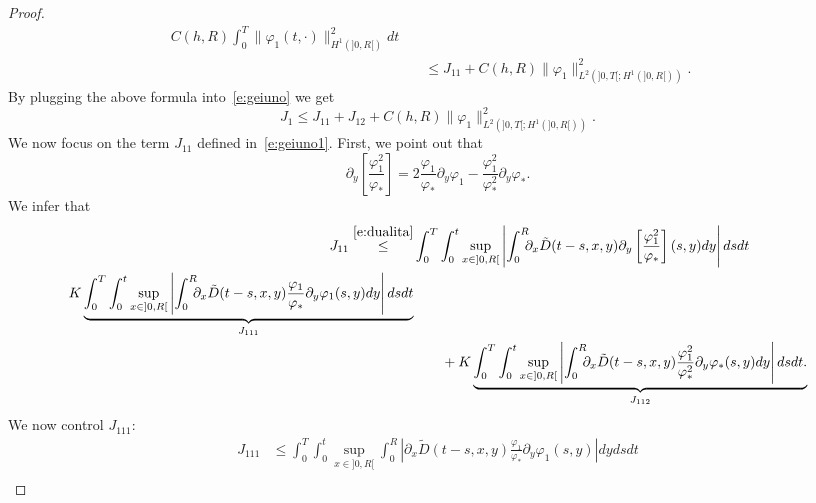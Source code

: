 \documentclass[11pt,leqno]{amsart}
\numberwithin{equation}{section}
\begin{document}
\begin{proof}
\begin{equation}
\begin{split}
   C(h, R) \int_0^T \| {\varphi}_1 (t, \cdot) \|^2_{H^1 (]0, R[)} dt
   \phantom{\int} \\
   & 
   \leq J_{11} + 
   C(h, R)  \| {\varphi}_1 \|^2_{L^2 (]0, T[ ; H^1 (]0, R[))}. 
    \phantom{\int} 
\end{split}
\end{equation}
By plugging the above formula into~\eqref{e:geiuno} we get 
\begin{equation}
\label{e:geiuno2}
  J_1 \leq J_{11} + J_{12} +  C(h, R)  \| {\varphi}_1 \|^2_{L^2 (]0, T[ ; H^1 (]0, R[))}.
\end{equation}
We now focus on the term $J_{11}$ defined in~\eqref{e:geiuno1}. First, we point out that 
\begin{equation}
\label{e:derivatax}
   \partial_y \left[ \frac{{\varphi}_1^2}{{\varphi}_\ast} \right] =
   2 \frac{{\varphi}_1}{{\varphi}_\ast} \partial_y {\varphi}_1 - 
    \frac{{\varphi}_1^2}{{\varphi}_\ast^2} \partial_y {\varphi}_\ast. 
\end{equation}
We infer that 
\begin{equation}
\label{e:geiunouno}
\begin{split}
 J_{11} \stackrel{\eqref{e:dualita}}{\leq} &
  \int_0^T   \int_0^t \sup_{x \in ]0, R[} 
    \left|
 \int_0^R \! \! \! \partial_{x} \tilde D(t-s, x, y) 
  \partial_y \left[ \frac{{\varphi}^2_1}{{\varphi}_\ast}  
  \right] (s, y) dy
  \right|  ds 
  dt  \\
  
   K \underbrace{\int_0^T   \int_0^t  
   \sup_{x \in ]0, R[} 
    \left|
    \int_0^R \! \! \! \partial_{x} \tilde D(t-s, x, y) 
   \frac{{\varphi}_1}{{\varphi}_\ast} \partial_y {\varphi}_1 
   (s, y) dy \right|
   ds 
   dt }_{J_{111}} \\  & \qquad + K \underbrace{
   \int_0^T   \int_0^t \sup_{x \in ]0, R[} 
    \left|
  \int_0^R \! \! \! \partial_{x} \tilde D(t-s, x, y) 
  \frac{{\varphi}_1^2}{{\varphi}_\ast^2} \partial_y {\varphi}_\ast
  (s, y) dy  \right|
   ds 
  dt.}_{J_{112}}
\end{split}
\end{equation}
We now control $J_{111}$:
\begin{equation}
\label{e:geiunounouno}
 \begin{split}
 J_{111} & \leq 
 \int_0^T  
  \int_0^t \sup_{x \in ]0, R[}  \int_0^R
  \left|   \partial_{x} \tilde D(t-s, x, y) 
   \frac{{\varphi}_1}{{\varphi}_\ast} \partial_y {\varphi}_1 
   (s, y)  \right|  dy
   ds 
  dt \\
  

\end{split}
\end{equation}
\end{proof}
\end{document}
